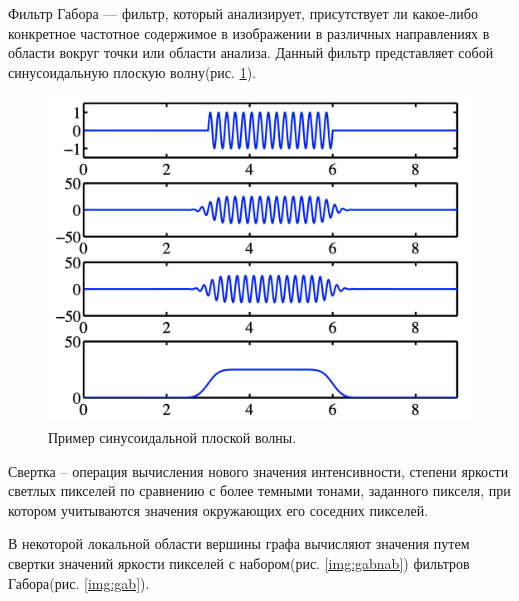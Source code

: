 Фильтр Габора --- фильтр, который анализирует, присутствует ли какое-либо конкретное частотное содержимое 
в изображении в различных направлениях в области вокруг точки или области анализа. Данный фильтр представляет собой 
синусоидальную плоскую волну(рис. \ref{img:sinuso}).\cite{gb}
\begin{figure}[h]
    \centering
    \includegraphics[width=0.35\textheight]{img/sin.png}
    \caption{Пример синусоидальной плоской волны.}
    \label{img:sinuso}
\end{figure}

\vspace{\baselineskip}
\vspace{\baselineskip}
\vspace{\baselineskip}
\vspace{\baselineskip}
\vspace{\baselineskip}
\vspace{\baselineskip}
\vspace{\baselineskip}

Свертка -- операция вычисления нового значения интенсивности, степени яркости
светлых пикселей по сравнению с более темными тонами,
заданного пикселя, при котором учитываются значения окружающих его соседних пикселей.

В некоторой локальной области вершины графа вычисляют значения
путем свертки значений яркости пикселей с набором(рис. \ref{img:gabnab}) фильтров Габора(рис. \ref{img:gab}).

